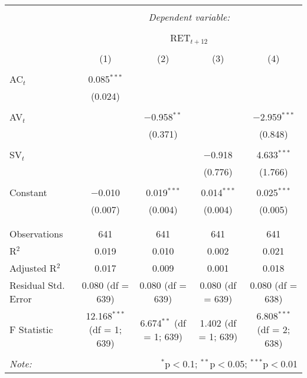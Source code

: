 
\begin{table}[!htbp] \centering 
  \caption{} 
  \label{} 
\begin{tabular}{@{\extracolsep{5pt}}lcccc} 
\\[-1.8ex]\hline 
\hline \\[-1.8ex] 
 & \multicolumn{4}{c}{\textit{Dependent variable:}} \\ 
\cline{2-5} 
\\[-1.8ex] & \multicolumn{4}{c}{RET$_{t+12}$} \\ 
\\[-1.8ex] & (1) & (2) & (3) & (4)\\ 
\hline \\[-1.8ex] 
 AC$_{t}$ & 0.085$^{***}$ &  &  &  \\ 
  & (0.024) &  &  &  \\ 
  & & & & \\ 
 AV$_{t}$ &  & $-$0.958$^{**}$ &  & $-$2.959$^{***}$ \\ 
  &  & (0.371) &  & (0.848) \\ 
  & & & & \\ 
 SV$_{t}$ &  &  & $-$0.918 & 4.633$^{***}$ \\ 
  &  &  & (0.776) & (1.766) \\ 
  & & & & \\ 
 Constant & $-$0.010 & 0.019$^{***}$ & 0.014$^{***}$ & 0.025$^{***}$ \\ 
  & (0.007) & (0.004) & (0.004) & (0.005) \\ 
  & & & & \\ 
\hline \\[-1.8ex] 
Observations & 641 & 641 & 641 & 641 \\ 
R$^{2}$ & 0.019 & 0.010 & 0.002 & 0.021 \\ 
Adjusted R$^{2}$ & 0.017 & 0.009 & 0.001 & 0.018 \\ 
Residual Std. Error & 0.080 (df = 639) & 0.080 (df = 639) & 0.080 (df = 639) & 0.080 (df = 638) \\ 
F Statistic & 12.168$^{***}$ (df = 1; 639) & 6.674$^{**}$ (df = 1; 639) & 1.402 (df = 1; 639) & 6.808$^{***}$ (df = 2; 638) \\ 
\hline 
\hline \\[-1.8ex] 
\textit{Note:}  & \multicolumn{4}{r}{$^{*}$p$<$0.1; $^{**}$p$<$0.05; $^{***}$p$<$0.01} \\ 
\end{tabular} 
\end{table} 
